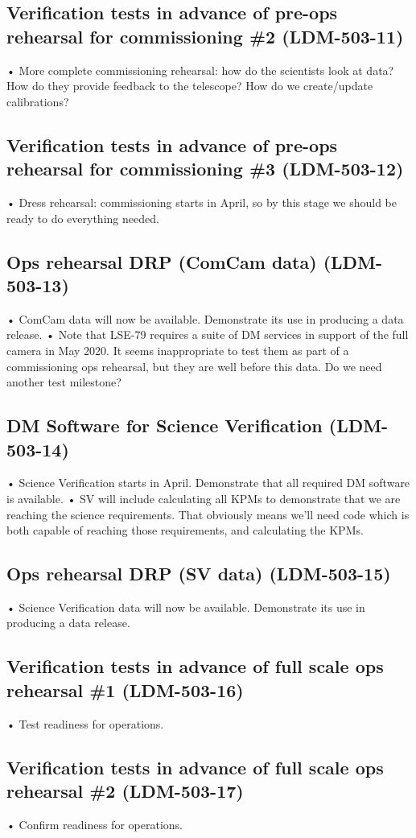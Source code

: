 \subsection{Verification tests in advance of pre-ops rehearsal for commissioning \#2 \textbf{(LDM-503-11)}\label{LDM-503-11}}
• More complete commissioning rehearsal: how do the scientists look at data? How do they provide feedback to the telescope? How do we create/update calibrations?
 \newline
\subsection{Verification tests in advance of pre-ops rehearsal for commissioning \#3 \textbf{(LDM-503-12)}\label{LDM-503-12}}
• Dress rehearsal: commissioning starts in April, so by this stage we should be ready to do everything needed.
 \newline
\subsection{ Ops rehearsal DRP (ComCam data) \textbf{(LDM-503-13)}\label{LDM-503-13}}
• ComCam data will now be available. Demonstrate its use in producing a data release.
 \newline• Note that LSE-79 requires a suite of DM services in support of the full camera in May 2020. It seems inappropriate to test them as part of a commissioning ops rehearsal, but they are well before this data. Do we need another test milestone?
\subsection{ DM Software for Science Verification \textbf{(LDM-503-14)}\label{LDM-503-14}}
• Science Verification starts in April. Demonstrate that all required DM software is available.
 \newline• SV will include calculating all KPMs to demonstrate that we are reaching the science requirements. That obviously means we'll need code which is both capable of reaching those requirements, and calculating the KPMs.
\subsection{ Ops rehearsal DRP (SV data) \textbf{(LDM-503-15)}\label{LDM-503-15}}
• Science Verification data will now be available. Demonstrate its use in producing a data release.
 \newline
\subsection{Verification tests in advance of full scale ops rehearsal \#1 \textbf{(LDM-503-16)}\label{LDM-503-16}}
• Test readiness for operations.
 \newline
\subsection{Verification tests in advance of full scale ops rehearsal \#2 \textbf{(LDM-503-17)}\label{LDM-503-17}}
• Confirm readiness for operations.
 \newline

